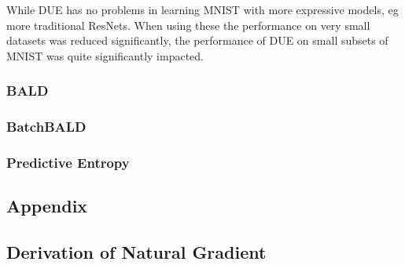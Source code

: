 \documentclass[12pt, a4paper]{report}
\theoremstyle{definition}
\theoremstyle{definition}
\theoremstyle{definition}
\begin{document}
While DUE has no problems in learning MNIST with more expressive models, eg more traditional ResNets. When using these the performance on very small datasets was reduced significantly, the performance of DUE on small subsets of MNIST was quite significantly impacted.


\subsection{BALD}

\subsection{BatchBALD}

\subsection{Predictive Entropy}






\renewcommand{\bibname}{Bibliography}



\begin{appendices}
\chapter{Appendix}

\section{Derivation of Natural Gradient }


\end{appendices}
\end{document}
